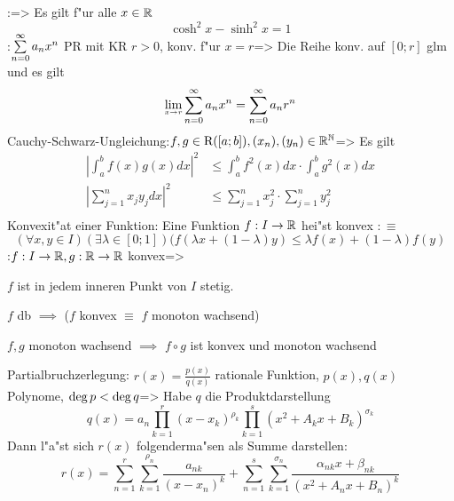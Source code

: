 \theorem:=>{
  Es gilt f"ur alle $x\in\mathbb R$
  \[\cosh^2 x-\sinh^2 x=1
    \]
  }
\theorem:$\sumn 0 a_nx^n$ PR mit KR $r>0$, konv. f"ur $x=r$=>{
  Die Reihe konv. auf $[0;r]$ glm und es gilt
  \[\limes x->r \sumn 0 a_n x^n=\sumn 0 a_n r^n
    \]
  }
\theorem Cauchy-Schwarz-Ungleichung:$f,g\in{\rm R}([a;b]),(x_n),(y_n)\in\mathbb R^{\mathbb N}$=>{
  Es gilt
  \begin{align*}
    \left|\int_a^b f(x)g(x) dx\right|^2 &\le
    \int_a^b f^2(x)dx \cdot \int_a^b g^2(x)dx\\
    \left|\sum_{j=1}^n x_j y_j dx\right|^2 &\le
    \sum_{j=1}^n  x_j^2\cdot \sum_{j=1}^n  y_j^2\\
  \end{align*}
  }
 Konvexit"at einer Funktion:{
  Eine Funktion $f:I\to\mathbb R$ hei"st konvex $:\equiv$
  \[(\forall x,y\in I)(\exists \lambda\in[0;1])
    (f(\lambda x+(1-\lambda)y)\le \lambda f(x)+(1-\lambda)f(y)
    \]
  }
\theorem:$f:I\to\mathbb R,g:\mathbb R\to\mathbb R$ konvex=>{
  \begin{stmts}
    \item $f$ ist in jedem inneren Punkt von $I$ stetig.
    \item $f$ db $\implies$ ($f$ konvex $\equiv$ $f$ monoton wachsend)
    \item $f,g$ monoton wachsend $\implies$ $f\circ g$ ist konvex und monoton
      wachsend
    \end{stmts}
  }
\theorem Partialbruchzerlegung:
  $r(x)=\frac {p(x)}{q(x)}$ rationale Funktion, $p(x),q(x)$ Polynome,
  $\operatorname{deg} p<\operatorname{deg} q$=>
  {
    Habe $q$ die Produktdarstellung
    \[
      q(x)=a_n\prod_{k=1}^r (x-x_k)^{\rho_k}
        \prod_{k=1}^s (x^2+A_k x+B_k)^{\sigma_k}
    \]
    Dann l"a"st sich $r(x)$ folgenderma"sen als Summe darstellen:
    \[
      r(x) = 
        \sum_{n=1}^r \sum_{k=1}^{\rho_n} 
          \frac {a_{nk}}{(x-x_n)^k}
        +
        \sum_{n=1}^s \sum_{k=1}^{\sigma_n}
	  \frac {\alpha_{nk} x+\beta_{nk}}{(x^2+A_nx+B_n)^k}
    \]
  }
